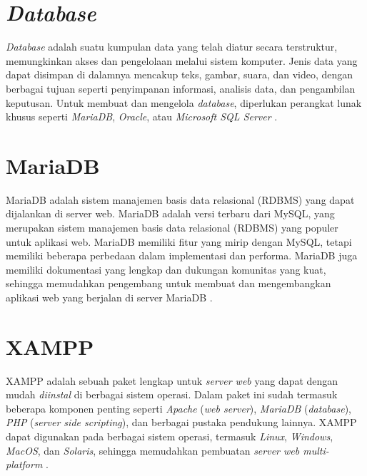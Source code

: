 \section{\textit{Database}}
\textit{Database} adalah suatu kumpulan data yang telah diatur secara terstruktur, memungkinkan akses dan pengelolaan melalui sistem komputer. Jenis data yang dapat disimpan di dalamnya mencakup teks, gambar, suara, dan video, dengan berbagai tujuan seperti penyimpanan informasi, analisis data, dan pengambilan keputusan. Untuk membuat dan mengelola \textit{database}, diperlukan perangkat lunak khusus seperti \textit{MariaDB}, \textit{Oracle}, atau \textit{Microsoft SQL Server} \cite{Cowls2021ADB}.

\section{MariaDB}
MariaDB adalah sistem manajemen basis data relasional (RDBMS) yang dapat dijalankan di server web. MariaDB adalah versi terbaru dari MySQL, yang merupakan sistem manajemen basis data relasional (RDBMS) yang populer untuk aplikasi web. MariaDB memiliki fitur yang mirip dengan MySQL, tetapi memiliki beberapa perbedaan dalam implementasi dan performa. MariaDB juga memiliki dokumentasi yang lengkap dan dukungan komunitas yang kuat, sehingga memudahkan pengembang untuk membuat dan mengembangkan aplikasi web yang berjalan di server MariaDB \cite{mariadb2024}.


\section{XAMPP}
XAMPP adalah sebuah paket lengkap untuk \textit{server web} yang dapat dengan mudah \textit{diinstal} di berbagai sistem operasi. Dalam paket ini sudah termasuk beberapa komponen penting seperti \textit{Apache} (\textit{web server}), \textit{MariaDB} (\textit{database}), \textit{PHP} (\textit{server side scripting}), dan berbagai pustaka pendukung lainnya. XAMPP dapat digunakan pada berbagai sistem operasi, termasuk \textit{Linux}, \textit{Windows}, \textit{MacOS}, dan \textit{Solaris}, sehingga memudahkan pembuatan \textit{server web multi-platform} \cite{pakpahan2020sistem}.

